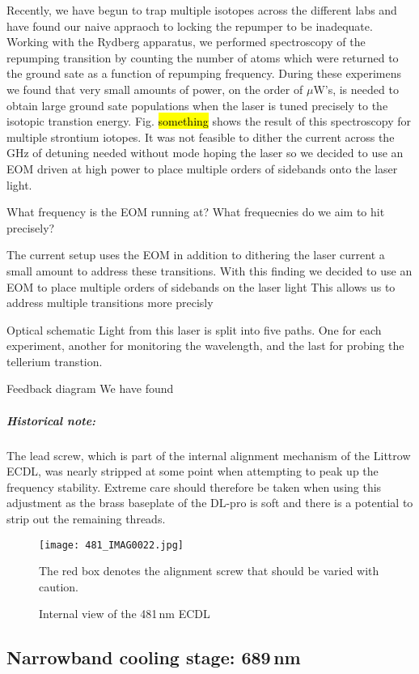 Recently, we have begun to trap multiple isotopes across the different labs and have found our naive appraoch to locking the repumper to be inadequate.
Working with the Rydberg apparatus, we performed spectroscopy of the repumping transition by counting the number of atoms which were returned to the ground sate as a function of repumping frequency.
During these experimens we found that very small amounts of power, on the order of $\mu$W's, is needed to obtain large ground sate populations when the laser is tuned precisely to the isotopic transtion energy. 
Fig. \hl{something} shows the result of this spectroscopy for multiple strontium iotopes.
It was not feasible to dither the current across the GHz of detuning needed without mode hoping the laser so we decided to use an EOM driven at high power to place multiple orders of sidebands onto the laser light.

What frequency is the EOM running at?
What frequecnies do we aim to hit precisely?

The current setup uses the EOM in addition to dithering the laser current a small amount to address these transitions.
With this finding we decided to use an EOM to place multiple orders of sidebands on the laser light
This allows us to address multiple transitions more precisly

Optical schematic
Light from this laser is split into five paths.
One for each experiment, another for monitoring the wavelength, and the last for probing the tellerium transtion.

Feedback diagram
We have found

\subparagraph{Historical note:}
The lead screw, which is part of the internal alignment mechanism of the Littrow ECDL, was nearly stripped at some point when attempting to peak up the frequency stability. 
Extreme care should therefore be taken when using this adjustment as the brass baseplate of the DL-pro is soft and there is a potential to strip out the remaining threads.
	\begin{figure}
		\centerline{
		\texttt{[image: 481\_IMAG0022.jpg]}}
		\caption{Internal view of the 481\,nm ECDL}{The red box denotes the alignment screw that should be varied with caution.}
		\label{fig:481internal}
	\end{figure}
 

\subsection{Narrowband cooling stage: 689\,nm} \label{ssec:689sys}
